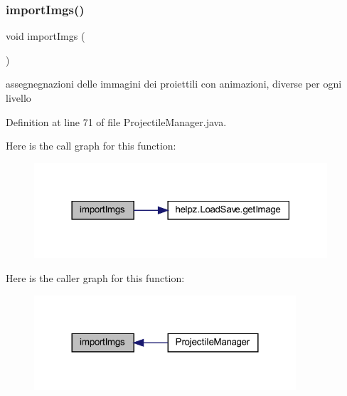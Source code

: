 \subsubsection{\texorpdfstring{import\+Imgs()}{importImgs()}}
{\footnotesize\ttfamily void import\+Imgs (\begin{DoxyParamCaption}{ }\end{DoxyParamCaption})\hspace{0.3cm}{\ttfamily [private]}}



assegnegnazioni delle immagini dei proiettili con animazioni, diverse per ogni livello 



Definition at line 71 of file Projectile\+Manager.\+java.

Here is the call graph for this function\+:
\nopagebreak
\begin{figure}[H]
\begin{center}
\leavevmode
\includegraphics[width=309pt]{classmanagers_1_1_projectile_manager_a78da03d9c5782fb25189cee3d4c78bfd_cgraph}
\end{center}
\end{figure}
Here is the caller graph for this function\+:
\nopagebreak
\begin{figure}[H]
\begin{center}
\leavevmode
\includegraphics[width=276pt]{classmanagers_1_1_projectile_manager_a78da03d9c5782fb25189cee3d4c78bfd_icgraph}
\end{center}
\end{figure}
\mbox{\label{classmanagers_1_1_projectile_manager_a57d53b4aface986fa08a24dab39b621d}} 
